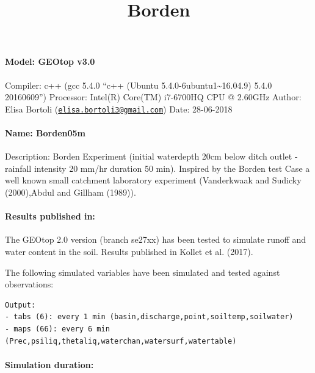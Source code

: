 \documentclass[
]{article}
\title{Borden}
\author{}
\date{\vspace{-2.5em}}
\begin{document}
\maketitle

\hypertarget{model-geotop-v3.0}{%
\paragraph{Model: GEOtop v3.0}\label{model-geotop-v3.0}}

Compiler: c++ (gcc 5.4.0 ``c++ (Ubuntu
5.4.0-6ubuntu1\textasciitilde16.04.9) 5.4.0 20160609'') Processor:
Intel(R) Core(TM) i7-6700HQ CPU @ 2.60GHz Author: Elisa Bortoli
(\href{mailto:elisa.bortoli3@gmail.com}{\nolinkurl{elisa.bortoli3@gmail.com}})
Date: 28-06-2018

\hypertarget{name-borden05m}{%
\paragraph{Name: Borden05m}\label{name-borden05m}}

Description: Borden Experiment (initial waterdepth 20cm below ditch
outlet - rainfall intensity 20 mm/hr duration 50 min). Inspired by the
Borden test Case a well known small catchment laboratory experiment
(Vanderkwaak and Sudicky (2000),Abdul and Gillham (1989)).

\hypertarget{results-published-in}{%
\paragraph{Results published in:}\label{results-published-in}}

The GEOtop 2.0 version (branch se27xx) has been tested to simulate
runoff and water content in the soil. Results published in Kollet et al.
(2017).

The following simulated variables have been simulated and tested against
observations:

\begin{verbatim}
Output:
- tabs (6): every 1 min (basin,discharge,point,soiltemp,soilwater)
- maps (66): every 6 min (Prec,psiliq,thetaliq,waterchan,watersurf,watertable)
\end{verbatim}

\hypertarget{simulation-duration}{%
\paragraph{Simulation duration:}\label{simulation-duration}}
\end{document}

